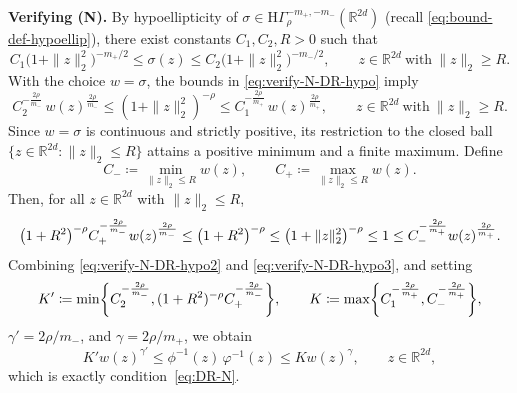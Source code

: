\documentclass[a4paper,12pt]{article}
\let\originalleft\left
\let\originalright\right
\renewcommand{\left}{\mathopen{}\mathclose\bgroup\originalleft}
\renewcommand{\right}{\aftergroup\egroup\originalright}
\newcommand{\R}{\mathbb{R}}
\newcommand{\hyposymbclassinv}{\mathrm{H}\Gamma^{-m_+,-m_-}_\rho}
\begin{document}
\textbf{Verifying (N).}
By hypoellipticity of $\sigma\in\hyposymbclassinv(\R^{2d})$
(recall \eqref{eq:bound-def-hypoellip}),
there exist constants $C_1,C_2,R>0$ such that
\begin{equation}\label{eq:verify-N-DR-hypo}
    C_1\bigl(1+\|z\|_2^2\bigr)^{-m_{+}/2}
    \le
    \sigma(z)
    \le
    C_2\bigl(1+\|z\|_2^2\bigr)^{-m_{-}/2},
    \qquad
    z\in\R^{2d}\ \text{with}\ \|z\|_2\ge R .
\end{equation}
With the choice $w=\sigma$, the bounds in \eqref{eq:verify-N-DR-hypo} imply
\begin{equation}\label{eq:verify-N-DR-hypo2}
    C_2^{-\frac{2\rho}{m_-}}\, w(z)^{\frac{2\rho}{m_-}}
    \le
    (1+\|z\|_2^2)^{-\rho}
    \le
    C_1^{-\frac{2\rho}{m_+}}\, w(z)^{\frac{2\rho}{m_+}},
    \qquad
    z\in\R^{2d}\ \text{with}\ \|z\|_2\ge R .
\end{equation}
Since $w=\sigma$ is continuous and strictly positive, its restriction to the
closed ball $\{z\in\R^{2d}:\|z\|_2\le R\}$ attains a positive minimum and a finite
maximum. Define %
\[
    C_- \coloneqq \min_{\|z\|_2\le R} w(z),
    \qquad
    C_+ \coloneqq \max_{\|z\|_2\le R} w(z).
\]
Then, for all $z\in\R^{2d}$ with $\|z\|_2\le R$,
\begin{equation}\label{eq:verify-N-DR-hypo3}
    \left(1+R^2\right)^{-\rho}  C_+^{-\frac{2\rho}{m_-}}  w(z)^{\frac{2\rho}{m_-}}
    \leq \left(1+R^2\right)^{-\rho}
    \leq \left(1+\|z\|_2^2\right)^{-\rho} 
    \leq 1 
    \leq C_-^{-\frac{2\rho}{m_+}} w(z)^{\frac{2\rho}{m_+}} .
\end{equation}
Combining \eqref{eq:verify-N-DR-hypo2} and \eqref{eq:verify-N-DR-hypo3}, and setting
\[
    K' \coloneqq
    \min \left\{
        C_2^{-\frac{2\rho}{m_-}},
        (1+R^2)^{-\rho} C_+^{-\frac{2\rho}{m_-}}
    \right\},
    \qquad
    K \coloneqq
    \max \left\{
        C_1^{-\frac{2\rho}{m_+}},
        C_-^{-\frac{2\rho}{m_+}}
    \right\},
\]
$\gamma'=2\rho/m_-$, and $\gamma=2\rho/m_+$,
we obtain
\[
    K' w(z)^{\gamma'}
    \le
    \phi^{-1}(z)\,\varphi^{-1}(z)
    \le
    K w(z)^{\gamma},
    \qquad z\in\R^{2d},
\]
which is exactly condition~\eqref{eq:DR-N}.
\end{document}
